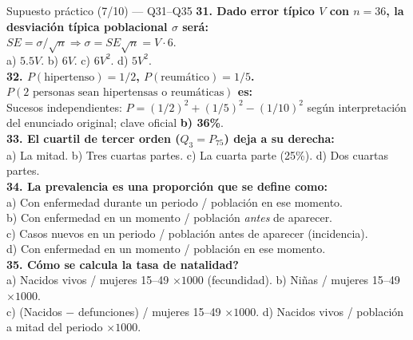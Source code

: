 \documentclass[aspectratio=169,8pt]{beamer}
\begin{document}
\begin{frame}{Supuesto pr\'actico (7/10) --- Q31--Q35}
  \scriptsize
  \textbf{31. Dado error t\'ipico $V$ con $n=36$, la desviaci\'on t\'ipica poblacional $\sigma$ ser\'a:}\\
  $SE=\sigma/\sqrt n \Rightarrow \sigma = SE\sqrt n = V\cdot6$.\\
  a) $5.5V$.\; b) $6V$.\; c) $6V^2$.\; d) $5V^2$.\\[3pt]
  \textbf{32. $P(\text{hipertenso})=1/2$, $P(\text{reum\'atico})=1/5$. $P(\text{2 personas sean hipertensas o reum\'aticas})$ es:}\\
  Sucesos independientes: $P=(1/2)^2+(1/5)^2-(1/10)^2$ seg\'un interpretaci\'on del enunciado original; clave oficial \textbf{b) 36\%}.\\[3pt]
  \textbf{33. El cuartil de tercer orden ($Q_3=P_{75}$) deja a su derecha:}\\
  a) La mitad.\; b) Tres cuartas partes.\; c) La cuarta parte (25\%).\; d) Dos cuartas partes.\\[3pt]
  \textbf{34. La prevalencia es una proporci\'on que se define como:}\\
  a) Con enfermedad durante un periodo / poblaci\'on en ese momento.\\
  b) Con enfermedad en un momento / poblaci\'on \emph{antes} de aparecer.\\
  c) Casos nuevos en un periodo / poblaci\'on antes de aparecer (incidencia).\\
  d) Con enfermedad en un momento / poblaci\'on en ese momento.\\[3pt]
  \textbf{35. \textquestiondown{}C\'omo se calcula la tasa de natalidad?}\\
  a) Nacidos vivos / mujeres 15--49 $\times1000$ (fecundidad).\;
  b) Ni\~nas / mujeres 15--49 $\times1000$.\\
  c) (Nacidos $-$ defunciones) / mujeres 15--49 $\times1000$.\;
  d) Nacidos vivos / poblaci\'on a mitad del periodo $\times1000$.
\end{frame}
\end{document}
